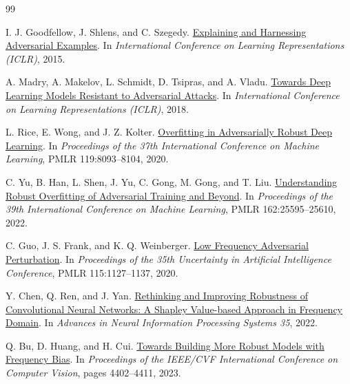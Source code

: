 \documentclass[11pt]{article}
\begin{document}
\clearpage
\begin{thebibliography}{99}

I. J. Goodfellow, J. Shlens, and C. Szegedy.
\newblock \href{https://arxiv.org/abs/1412.6572}{Explaining and Harnessing Adversarial Examples}.
\newblock In \emph{International Conference on Learning Representations
(ICLR)}, 2015.

A. Madry, A. Makelov, L. Schmidt, D. Tsipras, and A. Vladu.
\newblock \href{https://arxiv.org/abs/1706.06083}{Towards Deep Learning Models Resistant to Adversarial Attacks}.
\newblock In \emph{International Conference on Learning Representations
(ICLR)}, 2018.

L. Rice, E. Wong, and J. Z. Kolter.
\newblock \href{https://proceedings.mlr.press/v119/rice20a.html}{Overfitting in Adversarially Robust Deep Learning}.
\newblock In \emph{Proceedings of the 37th International Conference on Machine
Learning}, PMLR 119:8093--8104, 2020.

C. Yu, B. Han, L. Shen, J. Yu, C. Gong, M. Gong, and T. Liu.
\newblock \href{https://proceedings.mlr.press/v162/yu22b.html}{Understanding Robust Overfitting of Adversarial Training and Beyond}.
\newblock In \emph{Proceedings of the 39th International Conference on Machine
Learning}, PMLR 162:25595--25610, 2022.

C. Guo, J. S. Frank, and K. Q. Weinberger.
\newblock \href{https://proceedings.mlr.press/v115/guo20a.html}{Low Frequency Adversarial Perturbation}.
\newblock In \emph{Proceedings of the 35th Uncertainty in Artificial
Intelligence Conference}, PMLR 115:1127--1137, 2020.

Y. Chen, Q. Ren, and J. Yan.
\newblock \href{https://proceedings.neurips.cc/paper_files/paper/2022/hash/022abe84083d235f7572ca5cba24c51c-Abstract-Conference.html}{Rethinking and Improving Robustness of Convolutional Neural Networks:
A Shapley Value-based Approach in Frequency Domain}.
\newblock In \emph{Advances in Neural Information Processing Systems 35}, 2022.

Q. Bu, D. Huang, and H. Cui.
\newblock \href{https://openaccess.thecvf.com/content/ICCV2023/html/Bu_Towards_Building_More_Robust_Models_with_Frequency_Bias_ICCV_2023_paper.html}{Towards Building More Robust Models with Frequency Bias}.
\newblock In \emph{Proceedings of the IEEE/CVF International Conference on
Computer Vision}, pages 4402--4411, 2023.


\end{thebibliography}
\end{document}

